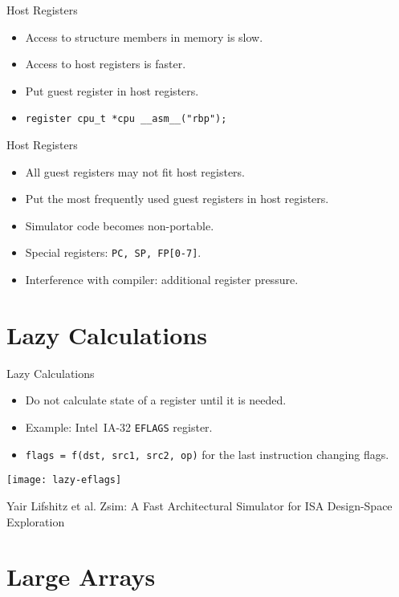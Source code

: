 \begin{frame}{Host Registers}
\begin{itemize}
\item Access to structure members in memory is slow.
\item Access to host registers is faster.
\item Put guest register in host registers.
\item \texttt{register cpu_t *cpu __asm__("rbp");}
\end{itemize}
\end{frame}

\begin{frame}{Host Registers}
\begin{itemize}
\item All guest registers may not fit host registers.
\item Put the most frequently used guest registers in host registers.
\item Simulator code becomes non-portable.
\item Special registers: \texttt{PC, SP, FP[0-7]}.
\item Interference with compiler: additional register pressure.
\end{itemize}
\end{frame}

\section{Lazy Calculations}

\begin{frame}{Lazy Calculations}
\begin{itemize}
\item Do not calculate state of a register until it is needed.
\item Example: Intel\reg~IA-32 \texttt{EFLAGS} register.
\item \texttt{flags = f(dst, src1, src2, op)} for the last instruction changing
  flags.
\end{itemize}
\vfill
\centering
\texttt{[image: lazy-eflags]}

\tiny{Yair Lifshitz et al. Zsim: A Fast Architectural Simulator for ISA Design-Space Exploration}
\end{frame}

\section{Large Arrays}

